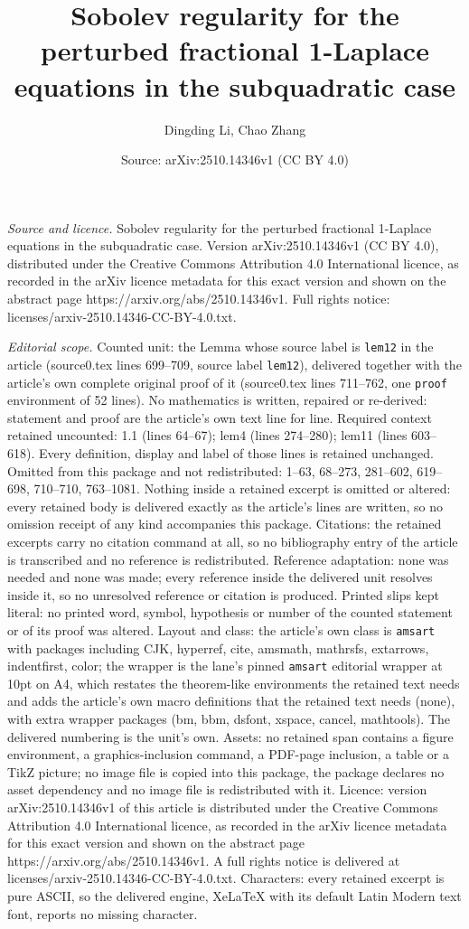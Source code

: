 \documentclass[10pt,a4paper]{amsart}
\title[Sobolev regularity for the perturbed fractional 1-Laplace eq]{Sobolev regularity for the perturbed fractional 1-Laplace equations in the subquadratic case}
\author{Dingding Li, Chao Zhang}
\date{Source: arXiv:2510.14346v1 (CC BY 4.0)}
\begin{document}
\maketitle

\noindent\emph{Source and licence.} Sobolev regularity for the perturbed fractional 1-Laplace equations in the subquadratic case. Version arXiv:2510.14346v1 (CC BY 4.0), distributed under the Creative Commons Attribution 4.0 International licence, as recorded in the arXiv licence metadata for this exact version and shown on the abstract page https://arxiv.org/abs/2510.14346v1. Full rights notice: licenses/arxiv-2510.14346-CC-BY-4.0.txt.\par\smallskip

\noindent\textit{Editorial scope.} Counted unit: the Lemma whose source label is \texttt{lem12} in the article (source0.tex lines 699--709, source label \texttt{lem12}), delivered together with the article's own complete original proof of it (source0.tex lines 711--762, one \texttt{proof} environment of 52 lines). No mathematics is written, repaired or re-derived: statement and proof are the article's own text line for line. Required context retained uncounted: 1.1 (lines 64--67); lem4 (lines 274--280); lem11 (lines 603--618). Every definition, display and label of those lines is retained unchanged. Omitted from this package and not redistributed: 1--63, 68--273, 281--602, 619--698, 710--710, 763--1081. Nothing inside a retained excerpt is omitted or altered: every retained body is delivered exactly as the article's lines are written, so no omission receipt of any kind accompanies this package. Citations: the retained excerpts carry no citation command at all, so no bibliography entry of the article is transcribed and no reference is redistributed. Reference adaptation: none was needed and none was made; every reference inside the delivered unit resolves inside it, so no unresolved reference or citation is produced. Printed slips kept literal: no printed word, symbol, hypothesis or number of the counted statement or of its proof was altered. Layout and class: the article's own class is \texttt{amsart} with packages including CJK, hyperref, cite, amsmath, mathrsfs, extarrows, indentfirst, color; the wrapper is the lane's pinned \texttt{amsart} editorial wrapper at 10pt on A4, which restates the theorem-like environments the retained text needs and adds the article's own macro definitions that the retained text needs (none), with extra wrapper packages (bm, bbm, dsfont, xspace, cancel, mathtools). The delivered numbering is the unit's own. Assets: no retained span contains a figure environment, a graphics-inclusion command, a PDF-page inclusion, a table or a TikZ picture; no image file is copied into this package, the package declares no asset dependency and no image file is redistributed with it. Licence: version arXiv:2510.14346v1 of this article is distributed under the Creative Commons Attribution 4.0 International licence, as recorded in the arXiv licence metadata for this exact version and shown on the abstract page https://arxiv.org/abs/2510.14346v1. A full rights notice is delivered at licenses/arxiv-2510.14346-CC-BY-4.0.txt. Characters: every retained excerpt is pure ASCII, so the delivered engine, XeLaTeX with its default Latin Modern text font, reports no missing character.
\end{document}

